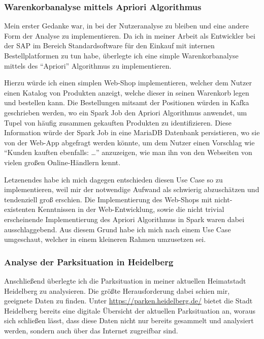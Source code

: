 \subsubsection{Warenkorbanalyse mittels Apriori Algorithmus}

Mein erster Gedanke war, in bei der Nutzeranalyse zu bleiben und eine andere Form der Analyse zu implementieren.
Da ich in meiner Arbeit als Entwickler bei der SAP im Bereich Standardsoftware für den Einkauf mit internen Bestellplatformen zu tun habe, überlegte ich eine simple Warenkorbanalyse mittels des \enquote{Apriori} Algorithmus zu implementieren.
\parencite{agrawal_fast_1994}

Hierzu würde ich einen simplen Web-Shop implementieren, welcher dem Nutzer einen Katalog von Produkten anzeigt, welche dieser in seinen Warenkorb legen und bestellen kann.
Die Bestellungen mitsamt der Positionen würden in Kafka geschrieben werden, wo ein Spark Job den Apriori Algorithmus anwendet, um Tupel von häufig zusammen gekauften Produkten zu identifizieren.
Diese Information würde der Spark Job in eine MariaDB Datenbank persistieren, wo sie von der Web-App abgefragt werden könnte, um dem Nutzer einen Vorschlag wie \enquote{Kunden kauften ebenfalls:  \ldots} anzuzeigen, wie man ihn von den Webseiten von vielen großen Online-Händlern kennt.

Letzenendes habe ich mich dagegen entschieden diesen Use Case so zu implementieren, weil mir der notwendige Aufwand als schwierig abzuschätzen und tendenziell groß erschien.
Die Implementierung des Web-Shops mit nicht-existenten Kenntnissen in der Web-Entwicklung, sowie die nicht trivial erscheinende Implementierung des Apriori Algorithmus in Spark waren dabei ausschlaggebend.
Aus diesem Grund habe ich mich nach einem Use Case umgeschaut, welcher in einem kleineren Rahmen umzusetzen sei.

\subsubsection{Analyse der Parksituation in Heidelberg}

Anschließend überlegte ich die Parksituation in meiner aktuellen Heimatstadt Heidelberg zu analysieren.
Die größte Herausforderung dabei schien mir, geeignete Daten zu finden.
Unter \url{https://parken.heidelberg.de/} bietet die Stadt Heidelberg bereits eine digitale Übersicht der aktuellen Parksituation an, woraus sich schließen lässt, dass diese Daten nicht nur bereits gesammelt und analysiert werden, sondern auch über das Internet zugreifbar sind.

